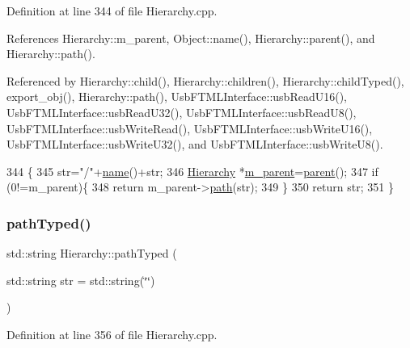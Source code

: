 Definition at line 344 of file Hierarchy.\+cpp.



References Hierarchy\+::m\+\_\+parent, Object\+::name(), Hierarchy\+::parent(), and Hierarchy\+::path().



Referenced by Hierarchy\+::child(), Hierarchy\+::children(), Hierarchy\+::child\+Typed(), export\+\_\+obj(), Hierarchy\+::path(), Usb\+F\+T\+M\+L\+Interface\+::usb\+Read\+U16(), Usb\+F\+T\+M\+L\+Interface\+::usb\+Read\+U32(), Usb\+F\+T\+M\+L\+Interface\+::usb\+Read\+U8(), Usb\+F\+T\+M\+L\+Interface\+::usb\+Write\+Read(), Usb\+F\+T\+M\+L\+Interface\+::usb\+Write\+U16(), Usb\+F\+T\+M\+L\+Interface\+::usb\+Write\+U32(), and Usb\+F\+T\+M\+L\+Interface\+::usb\+Write\+U8().


\begin{DoxyCode}
344                                       \{
345   str=\textcolor{stringliteral}{"/"}+\hyperlink{classObject_a300f4c05dd468c7bb8b3c968868443c1}{name}()+str;
346   \hyperlink{classHierarchy}{Hierarchy} *\hyperlink{classHierarchy_a5814bb280d4e8539ab25ab6cbfb9cc4f}{m\_parent}=\hyperlink{classHierarchy_a1c7bec8257e717f9c1465e06ebf845fc}{parent}();
347   \textcolor{keywordflow}{if} (0!=m\_parent)\{
348     \textcolor{keywordflow}{return} m\_parent->\hyperlink{classHierarchy_aa7990fa7caf132d83e361ce033c6c65a}{path}(str);
349   \}
350   \textcolor{keywordflow}{return} str;
351 \}
\end{DoxyCode}
\mbox{\label{classHierarchy_a1efd56cd164d328d2002e53a10a19b8c}} 
\subsubsection{\texorpdfstring{path\+Typed()}{pathTyped()}}
{\footnotesize\ttfamily std\+::string Hierarchy\+::path\+Typed (\begin{DoxyParamCaption}\item[{std\+::string}]{str = {\ttfamily std\+:\+:string(\char`\"{}\char`\"{})} }\end{DoxyParamCaption})\hspace{0.3cm}{\ttfamily [inherited]}}



Definition at line 356 of file Hierarchy.\+cpp.



